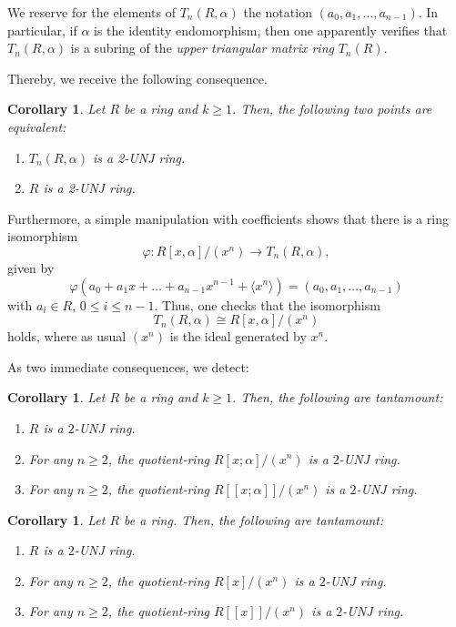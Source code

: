 \documentclass[12pt]{amsart}
\newtheorem{corollary}[theorem]{Corollary}
\theoremstyle{definition}
\begin{document}
\medskip

We reserve for the elements of $T_{n}(R, \alpha)$ the notation $(a_{0},a_{1},\ldots , a_{n-1})$. In particular, if $\alpha $ is the identity endomorphism, then one apparently verifies that $T_{n}(R,\alpha )$ is a subring of the {\it upper triangular matrix ring} $T_{n}(R)$.

Thereby, we receive the following consequence.

\begin{corollary}
Let $R$ be a ring and $k\geq 1$. Then, the following two points are equivalent:
\begin{enumerate}
\item
$T_{n}(R,\alpha )$ is a 2-UNJ ring.
\item
$R$ is a 2-UNJ ring.
\end{enumerate}
\end{corollary}

Furthermore, a simple manipulation with coefficients shows that there is a ring isomorphism $$\varphi : R[x,\alpha]/(x^n)\rightarrow T_{n}(R,\alpha),$$ given by $$\varphi (a_{0}+a_{1}x+\ldots +a_{n-1}x^{n-1}+\langle x^{n} \rangle )=(a_{0},a_{1},\ldots ,a_{n-1})$$ with $a_{i}\in R$, $0\leq i\leq n-1$. Thus, one checks that the isomorphism $$T_{n}(R,\alpha )\cong R[x,\alpha ]/(x^n)$$ holds, where as usual $(x^n)$ is the ideal generated by $x^{n}$.

\medskip

As two immediate consequences, we detect:

\begin{corollary}
Let $R$ be a ring and $k\geq 1$. Then, the following are tantamount:
\begin{enumerate}
\item
$R$ is a $2$-UNJ ring.
\item
For any $n\geq 2$, the quotient-ring $R[x; \alpha]/(x^n)$ is a $2$-UNJ ring.
\item
For any $n\geq 2$, the quotient-ring $R[[x; \alpha]]/(x^n)$ is a $2$-UNJ ring.
\end{enumerate}
\end{corollary}

\begin{corollary}
Let $R$ be a ring. Then, the following are tantamount:
\begin{enumerate}
\item
$R$ is a $2$-UNJ ring.
\item
For any $n\geq 2$, the quotient-ring $R[x]/(x^n)$ is a $2$-UNJ ring.
\item
For any $n\geq 2$, the quotient-ring $R[[x]]/(x^n)$ is a $2$-UNJ ring.
\end{enumerate}
\end{corollary}
\end{document}
